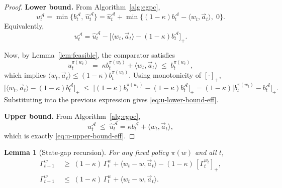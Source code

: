 \documentclass[11pt]{article}
\newtheorem{Thm:Lemma}{Lemma}
\begin{document}
\begin{proof}
\textbf{Lower bound.}
From Algorithm~\ref{alg:egpc},
\[
u_t^\mathcal{A}
= \min\!\bigl\{ b_t^\mathcal{A},\, \widehat{u}_t^\mathcal{A} \bigr\}
= \widehat{u}_t^\mathcal{A} + \min\!\bigl\{ (1-\kappa)b_t^\mathcal{A}-\langle w_t,\vec{a}_t\rangle,\; 0 \bigr\}.
\]
Equivalently,
\[
u_t^\mathcal{A}
= \widehat{u}_t^\mathcal{A} - \big[\langle w_t,\vec{a}_t\rangle - (1-\kappa)b_t^\mathcal{A}\big]_+ .
\]

Now, by Lemma~\ref{lem:feasible}, the comparator satisfies
\[
u_t^{\pi(w_t)} \;=\; \kappa b_t^{\pi(w_t)} + \langle w_t,\vec{a}_t\rangle \;\le\; b_t^{\pi(w_t)},
\]
which implies
\(\langle w_t,\vec{a}_t\rangle \le (1-\kappa)b_t^{\pi(w_t)}\).
Using monotonicity of \([\cdot]_+\),
\[
\big[\langle w_t,\vec{a}_t\rangle - (1-\kappa)b_t^\mathcal{A}\big]_+
\;\le\;
\big[(1-\kappa)b_t^{\pi(w_t)} - (1-\kappa)b_t^\mathcal{A}\big]_+
= (1-\kappa)\big[b_t^{\pi(w_t)} - b_t^\mathcal{A}\big]_+.
\]
Substituting into the previous expression gives \eqref{eq:u-lower-bound-eff}.

\medskip
\noindent
\textbf{Upper bound.}
From Algorithm~\ref{alg:egpc},
\[
u_t^\mathcal{A} \;\le\; \widehat{u}_t^\mathcal{A}
= \kappa b_t^\mathcal{A} + \langle w_t, \vec{a}_t\rangle,
\]
which is exactly \eqref{eq:u-upper-bound-eff}.
\end{proof}




\begin{Thm:Lemma}[State-gap recursion]
\label{lem:state-gap-recursion-eff}
For any fixed policy \(\pi(w)\) and all \(t\),
\begin{align}
\label{eq:GAMMA-Lower}
\Gamma_{t+1}^w
&\;\ge\;
(1-\kappa)\,\Gamma_{t}^w
+\langle w_t - w, \vec{a}_t\rangle
-(1-\kappa)\,[\Gamma_{t}^{w_t}]_+ , \\[4pt]
\label{eq:GAMMA-Upper}
\Gamma_{t+1}^w
&\;\le\;
(1-\kappa)\,\Gamma_{t}^w
+\langle w_t - w, \vec{a}_t\rangle .
\end{align}
\end{Thm:Lemma}
\end{document}
